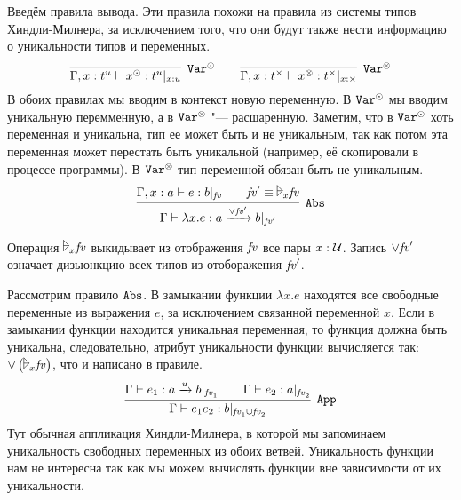Введём правила вывода. Эти правила похожи на правила из системы типов Хиндли-Милнера,
за исключением того, что они будут также нести информацию о уникальности типов и переменных.
\[
	\infer[\ruleVarU]{\Gamma, x : t^u \vdash x^\odot : t^u |_{x:u}}{} \qquad
	\infer[\ruleVarS]{\Gamma, x : t^\times \vdash x^\otimes : t^\times |_{x:\times}}{}
\]
В обоих правилах мы вводим в контекст новую переменную.
В $\mathtt{Var^\odot}$ мы вводим уникальную перемменную, а в $\mathtt{Var^\otimes}$ "--- расшаренную.
Заметим, что в $\mathtt{Var^\odot}$ хоть переменная и уникальна, тип ее может быть и не уникальным,
так как потом эта переменная может перестать быть уникальной (например, её скопировали в процессе программы).
В $\mathtt{Var^\otimes}$ тип переменной обязан быть не уникальным.
\[
	\infer[\ruleAbs]
		{\Gamma \vdash \lambda x.e : a \xrightarrow{\vee \fv'} b |_{\fv'}}
		{\Gamma, x : a \vdash e : b |_{\fv} && \fv' \equiv \fuck_x \fv} \\
\]

Операция $\fuck_x \fv$ выкидывает из отображения $\mathit{fv}$ все пары $x : \operatorname{\mathcal{U}}$.
Запись $\vee \mathit{fv}'$ означает дизьюнкцию всех типов из отоборажения $\mathit{fv}'$.

Рассмотрим правило $\mathtt{Abs}$.
В замыкании функции $\lambda x.e$ находятся все свободные переменные из выражения $e$, за исключением связанной переменной $x$.
Если в замыкании функции находится уникальная переменная, то функция должна быть уникальна, следовательно,
атрибут уникальности функции вычисляется так: $\vee \left( \fuck_x \fv \right)$, что и написано в правиле.
\[
	\infer[\ruleApp]
		{\Gamma \vdash e_1e_2 : b |_{\fv_1 \cup \fv_2}}
		{\Gamma \vdash e_1 : a \xrightarrow{u} b |_{\fv_1} \qquad \Gamma \vdash e_2 : a |_{\fv_2}}
\]
Тут обычная аппликация Хиндли-Милнера, в которой мы запоминаем уникальность свободных переменных из обоих ветвей.
Уникальность функции нам не интересна так как мы можем вычислять функции вне зависимости от их уникальности.

